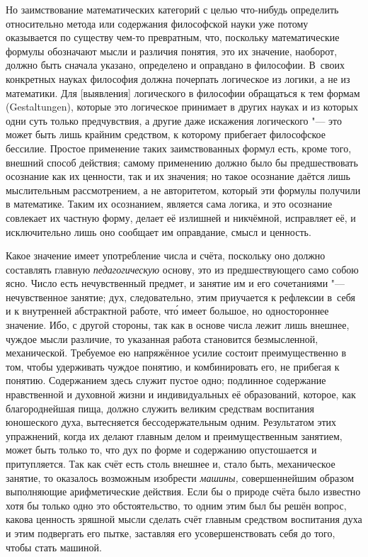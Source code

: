 Но заимствование математических категорий с целью что-нибудь определить
относительно метода или содержания философской науки уже потому оказывается по
существу чем-то превратным, что, поскольку математические формулы обозначают
мысли и различия понятия, это их значение, наоборот, должно быть сначала
указано, определено и оправдано в философии. В~своих конкретных науках
философия должна почерпать логическое из логики, а не из математики. Для
[выявления] логического в философии обращаться к тем формам (Gestal\-tungen),
которые это логическое принимает в других науках и из которых одни суть только
предчувствия, а другие даже искажения логического "--- это может быть лишь
крайним средством, к которому прибегает философское бессилие. Простое применение
таких заимствованных формул есть, кроме того, внешний способ действия; самому
применению должно было бы предшествовать осознание как их ценности, так и их
значения; но такое осознание даётся лишь мыслительным рассмотрением, а не
авторитетом, который эти формулы получили в математике. Таким их осознанием,
является сама логика, и это осознание совлекает их частную форму, делает её
излишней и никчёмной, исправляет её, и исключительно лишь оно сообщает им
оправдание, смысл и ценность.

Какое значение имеет употребление числа и счёта, поскольку оно должно
составлять главную {\em педагогическую} основу, это из предшествующего само
собою ясно. Число есть нечувственный предмет, и занятие им и его сочетаниями
"--- нечувственное занятие; дух, следовательно, этим приучается к рефлексии
в~себя и к внутренней абстрактной работе, чт\'{о} имеет большое, но одностороннее
значение. Ибо, с другой стороны, так как в основе числа лежит лишь внешнее,
чуждое мысли различие, то указанная работа становится безмысленной,
механической. Требуемое ею напряжённое усилие состоит преимущественно в том,
чтобы удерживать чуждое понятию, и комбинировать его, не прибегая к понятию.
Содержанием здесь служит пустое одно; подлинное содержание
нравственной и духовной жизни и индивидуальных её образований, которое, как
благороднейшая пища, должно служить великим средствам воспитания юношеского
духа, вытесняется бессодержательным одним. Результатом этих упражнений,
когда их делают главным делом и преимущественным занятием, может быть только
то, что дух по форме и содержанию опустошается и притупляется. Так как счёт
есть столь внешнее и, стало быть, механическое занятие, то оказалось возможным
изобрести {\em машины,} совершеннейшим образом выполняющие арифметические
действия. Если бы о природе счёта было известно хотя бы только одно это
обстоятельство, то одним этим был бы решён вопрос, какова ценность зряшной
мысли сделать счёт главным средством воспитания духа и этим подвергать его
пытке, заставляя его усовершенствовать себя до того, чтобы стать машиной.

